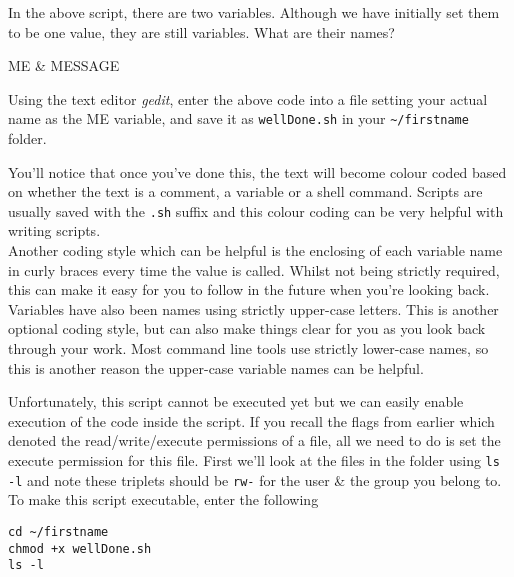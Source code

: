 \begin{questions}
In the above script, there are two variables. 
Although we have initially set them to be one value, they are still variables.
What are their names? 
\begin{answer}
ME \& MESSAGE
\end{answer}
\end{questions}

\begin{steps}
Using the text editor \textit{gedit}, enter the above code into a file setting your actual name as the ME variable,  and save it as \texttt{wellDone.sh} in your \texttt{\~{}/firstname} folder.\\
\end{steps}

\begin{information}
You'll notice that once you've done this, the text will become colour coded based on whether the text is a comment, a variable or a shell command.
Scripts are usually saved with the \texttt{.sh} suffix and this colour coding can be very helpful with writing scripts.\\

Another coding style which can be helpful is the enclosing of each variable name in curly braces every time the value is called.
Whilst not being strictly required, this can make it easy for you to follow in the future when you're looking back.
Variables have also been names using strictly upper-case letters.
This is another optional coding style, but can also make things clear for you as you look back through your work.
Most command line tools use strictly lower-case names, so this is another reason the upper-case variable names can be helpful.
\end{information}

\begin{steps}
Unfortunately, this script cannot be executed yet but we can easily enable execution of the code inside the script.
If you recall the flags from earlier which denoted the read/write/execute permissions of a file, all we need to do is set the execute permission for this file.
First we'll look at the files in the folder using \texttt{ls -l} and note these triplets should be \texttt{rw-} for the user \& the group you belong to.
To make this script executable, enter the following
\begin{lstlisting}
cd ~/firstname
chmod +x wellDone.sh
ls -l
\end{lstlisting}
\end{steps}

